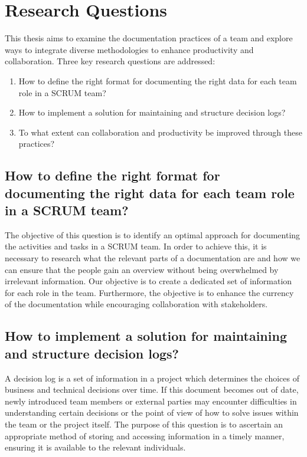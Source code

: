 \section{Research Questions}

This thesis aims to examine the documentation practices of a team and explore ways to integrate diverse methodologies to enhance productivity and collaboration. Three key research questions are addressed:

\begin{enumerate}[start=1,label={(\bfseries R\arabic*):}]
\item How to define the right format for documenting the right data for each team role in a SCRUM team?
\item How to implement a solution for maintaining and structure decision logs?
\item To what extent can collaboration and productivity be improved through these practices?
\end{enumerate}

\subsection{How to define the right format for documenting the right data for each team role in a SCRUM team?}
The objective of this question is to identify an optimal approach for documenting the activities and tasks in a SCRUM team. In order to achieve this, it is necessary to research what the relevant parts of a documentation are and how we can ensure that the people gain an overview without being overwhelmed by irrelevant information. Our objective is to create a dedicated set of information for each role in the team. Furthermore, the objective is to enhance the currency of the documentation while encouraging collaboration with stakeholders.

\subsection{How to implement a solution for maintaining and structure decision logs?}
A decision log is a set of information in a project which determines the choices of business and technical decisions over time. If this document becomes out of date, newly introduced team members or external parties may encounter difficulties in understanding certain decisions or the point of view of how to solve issues within the team or the project itself. The purpose of this question is to ascertain an appropriate method of storing and accessing information in a timely manner, ensuring it is available to the relevant individuals.

